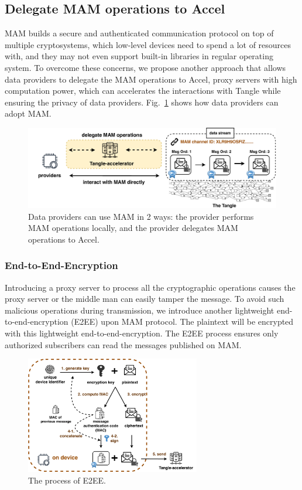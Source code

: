 \documentclass[conference]{IEEEtran}
\begin{document}
\subsection{Delegate MAM operations to Accel}
\label{section:ta_endpoint}
MAM builds a secure and authenticated communication protocol on top of multiple cryptosystems, which low-level devices need to spend a lot of resources with, and they may not even support built-in libraries in regular operating system. To overcome these concerns, we propose another approach that allows data providers to delegate the MAM operations to Accel, proxy servers with high computation power, which can accelerates the interactions with Tangle while ensuring the privacy of data providers. Fig.~\ref{fig:delegation} shows how data providers can adopt MAM.

\begin{figure}[!t]
    \centering
    \includegraphics[width=\linewidth]{delegation}
    \caption{Data providers can use MAM in 2 ways: the provider performs MAM operations locally, and the provider delegates MAM operations to Accel.}
    \label{fig:delegation}
\end{figure}

\subsubsection{End-to-End-Encryption}
Introducing a proxy server to process all the cryptographic operations causes the proxy server or the middle man can easily tamper the message. To avoid such malicious operations during transmission, we introduce another lightweight end-to-end-encryption (E2EE) upon MAM protocol. The plaintext will be encrypted with this lightweight end-to-end-encryption. The E2EE process ensures only authorized subscribers can read the messages published on MAM.

\begin{figure}[!h]
    \centering
    \includegraphics[width=3in]{MAM_E2EE_fold}
    \caption{The process of E2EE.}
    \label{fig:MAM_E2EE}
\end{figure}
\end{document}
